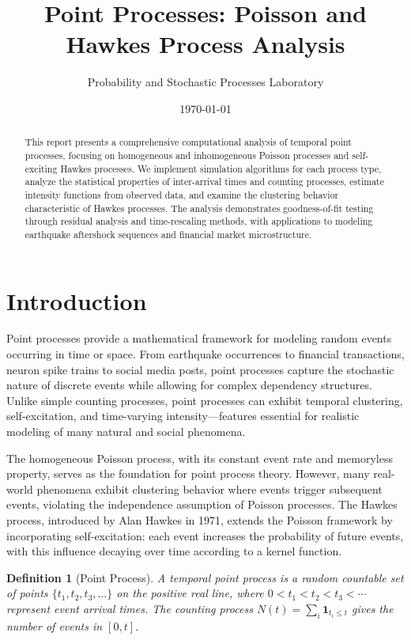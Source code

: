 \documentclass[a4paper, 11pt]{article}
\title{Point Processes: Poisson and Hawkes Process Analysis}
\author{Probability and Stochastic Processes Laboratory}
\date{\today}
\newtheorem{definition}{Definition}[section]
\begin{document}
\maketitle

\begin{abstract}
This report presents a comprehensive computational analysis of temporal point processes,
focusing on homogeneous and inhomogeneous Poisson processes and self-exciting Hawkes
processes. We implement simulation algorithms for each process type, analyze the
statistical properties of inter-arrival times and counting processes, estimate intensity
functions from observed data, and examine the clustering behavior characteristic of
Hawkes processes. The analysis demonstrates goodness-of-fit testing through residual
analysis and time-rescaling methods, with applications to modeling earthquake aftershock
sequences and financial market microstructure.
\end{abstract}

\section{Introduction}

Point processes provide a mathematical framework for modeling random events occurring
in time or space. From earthquake occurrences to financial transactions, neuron spike
trains to social media posts, point processes capture the stochastic nature of discrete
events while allowing for complex dependency structures. Unlike simple counting processes,
point processes can exhibit temporal clustering, self-excitation, and time-varying
intensity---features essential for realistic modeling of many natural and social phenomena.

The homogeneous Poisson process, with its constant event rate and memoryless property,
serves as the foundation for point process theory. However, many real-world phenomena
exhibit clustering behavior where events trigger subsequent events, violating the
independence assumption of Poisson processes. The Hawkes process, introduced by
Alan Hawkes in 1971, extends the Poisson framework by incorporating self-excitation:
each event increases the probability of future events, with this influence decaying
over time according to a kernel function.

\begin{definition}[Point Process]
A temporal point process is a random countable set of points $\{t_1, t_2, t_3, \ldots\}$
on the positive real line, where $0 < t_1 < t_2 < t_3 < \cdots$ represent event arrival
times. The counting process $N(t) = \sum_{i} \mathbf{1}_{t_i \leq t}$ gives the number
of events in $[0, t]$.
\end{definition}
\end{document}
